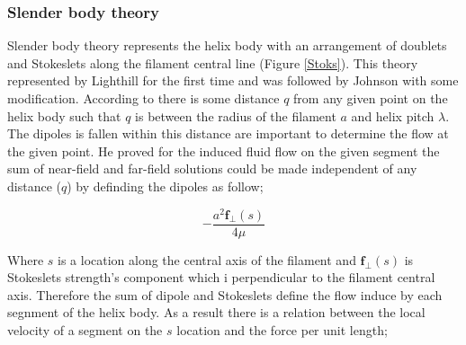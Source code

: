 \documentclass[12pt,a4paper,titlepage]{report}
\begin{document}
\subsubsection{Slender body theory}\label{method1}

Slender body theory represents the helix body with an arrangement of
 doublets and Stokeslets along the filament central line (Figure \ref{Stoks}). This theory represented by 
Lighthill for the first time and was followed by Johnson with some modification. According to \citeauthor{lighthill1971large}
there is some distance $q$ from any given point on the helix body such that $q$ is between the radius of the
filament $a$ and helix pitch $\lambda$. The dipoles is fallen within this distance are important to determine the flow at the
given point. He proved for the induced fluid flow on the given segment 
the sum of near-field and far-field solutions could be made independent of any distance ($q$) by definding
the dipoles as follow;

  

\begin{equation}
-\frac{a^2 \bm{f}_\perp (s)}{4\mu}
\label{dipole}
\end{equation}

Where $s$ is a location along the central axis of the filament and $\bm{f}_\perp (s)$ is Stokeslets strength\rq{}s
component which i perpendicular to the filament central axis. Therefore the sum of dipole and Stokeslets
define the flow induce by each segnment of the helix body. As a result there is a relation between 
the local velocity of a segment on the $s$ location and the force per unit length;
\end{document}
